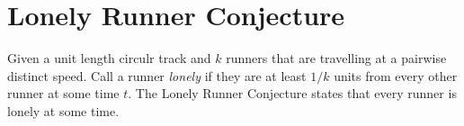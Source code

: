 \documentclass[a4paper]{article}
\begin{document}
\section{Lonely Runner Conjecture}
Given a unit length circulr track and $k$ runners that are travelling at a pairwise distinct speed. Call a runner \emph{lonely} if they are at least $1/k$ units from every other runner at some time $t$. The Lonely Runner Conjecture states that every runner is lonely at some time.
\end{document}
